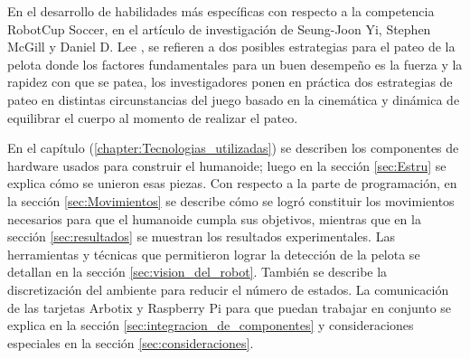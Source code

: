 En el desarrollo de habilidades más específicas con respecto a la competencia RobotCup Soccer, en el artículo de investigación de Seung-Joon Yi, Stephen McGill y Daniel D. Lee  \cite{paper2}, se refieren a dos posibles estrategias para el pateo de la pelota donde los factores fundamentales para un buen desempeño es la fuerza y la rapidez con que se patea, los investigadores ponen en pr\'actica dos estrategias de pateo en distintas circunstancias del juego basado en la cinemática y dinámica de equilibrar el cuerpo al momento de realizar el pateo.

En el capítulo (\ref{chapter:Tecnologias_utilizadas}) se describen los componentes de hardware usados para construir el humanoide; luego en la sección \ref{sec:Estru}
se explica cómo se unieron esas piezas. Con respecto a la parte de programación, en la secci\'on \ref{sec:Movimientos} se describe c\'omo se logró constituir los movimientos necesarios para que el humanoide cumpla sus objetivos, mientras que en la secci\'on \ref{sec:resultados} se muestran los resultados experimentales. Las herramientas y técnicas  que  permitieron lograr  la detección de la pelota se detallan en la secci\'on \ref{sec:vision_del_robot}. También se describe la discretización del ambiente para reducir el n\'umero de estados. La comunicación de las tarjetas Arbotix y Raspberry Pi para que puedan trabajar en conjunto se explica en la secci\'on \ref{sec:integracion_de_componentes}  y consideraciones especiales en la secci\'on \ref{sec:consideraciones}.

